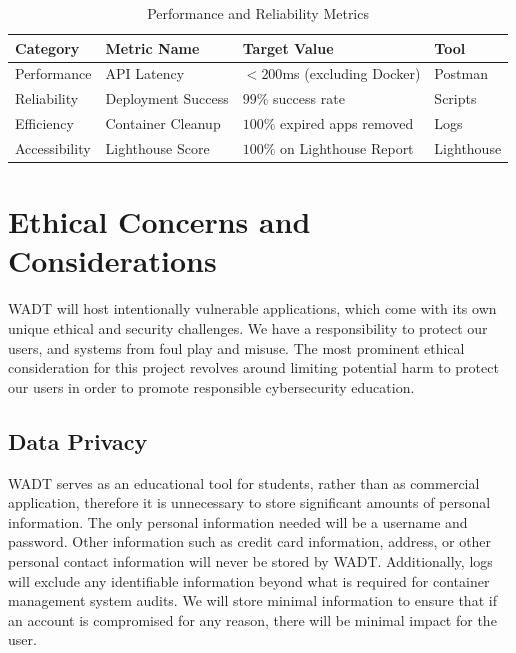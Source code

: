 \documentclass[12pt,titlepage]{article}
\begin{document}
\begin{table}[h!]
\centering
\begin{tabular}{|l|l|>{\raggedright\arraybackslash}p{5cm}|l|}
\hline
\textbf{Category} & \textbf{Metric Name} & \textbf{Target Value} & \textbf{Tool} \\ \hline

Performance & API Latency & $< 200$ms (excluding Docker) & Postman \\ \hline
Reliability & Deployment Success & $99\%$ success rate & Scripts \\ \hline
Efficiency & Container Cleanup & $100\%$ expired apps removed & Logs \\ \hline
Accessibility &  Lighthouse Score & $100\%$ on Lighthouse Report & Lighthouse \\ \hline
\end{tabular}
\caption{Performance and Reliability Metrics}
\label{table:performance-metrics}
\end{table}

\section{Ethical Concerns and Considerations}

WADT will host intentionally vulnerable applications, which come with its own unique ethical and security challenges. We have a responsibility to protect our users, and systems from foul play and misuse. The most prominent ethical consideration for this project revolves around limiting potential harm to protect our users in order to promote responsible cybersecurity education. 

\subsection{Data Privacy}
WADT serves as an educational tool for students, rather than as commercial application, therefore it is unnecessary to store significant amounts of personal information. The only personal information needed will be a username and password. Other information such as credit card information, address, or other personal contact information will never be stored by WADT. Additionally, logs will exclude any identifiable information beyond what is required for container management system audits. We will store minimal information to ensure that if an account is compromised for any reason, there will be minimal impact for the user. 
\end{document}
